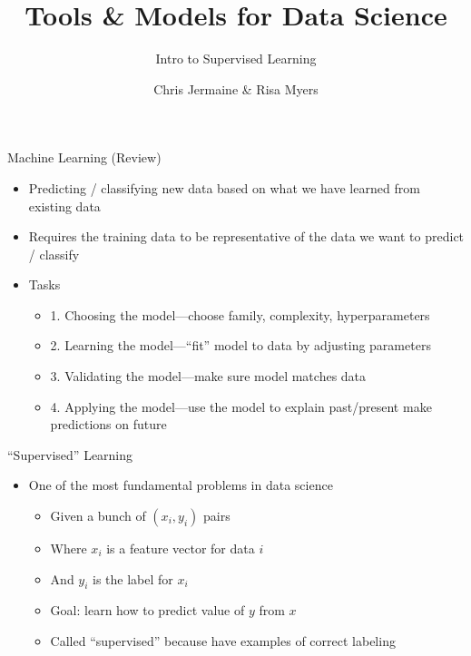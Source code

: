 \documentclass[aspectratio=169]{beamer}
\title[]
{Tools \& Models for Data Science}
\subtitle{Intro to Supervised Learning}
\author[]{Chris Jermaine \& Risa Myers}
\institute
{
  Rice University 
}
\date[]{}
\begin{document}
\begin{frame}
 \titlepage
\end{frame}

\begin{frame}{Machine Learning (Review)}

\begin{itemize}
\item Predicting / classifying new data based on what we have learned from existing data
\item Requires the training data to be representative of the data we want to predict / classify
\item Tasks
	\begin{itemize}
	\item 1. Choosing the model---choose family, complexity, hyperparameters
	\item 2. Learning the model---``fit'' model to data by adjusting parameters
	\item 3. Validating the model---make sure model matches data
	\item 4. Applying the model---use the model to explain past/present make predictions on future
	\end{itemize}
\end{itemize}
\end{frame}
\begin{frame}{``Supervised'' Learning}

\begin{itemize}
\item One of the most fundamental problems in data science
	\begin{itemize}
	\item Given a bunch of $(x_i, y_i)$ pairs
	\item Where $x_i$ is a feature vector for data $i$
	\item And $y_i$ is the label for $x_i$ 
	\item Goal: learn how to predict value of $y$ from $x$
	\item Called ``supervised'' because have examples of correct labeling
	\end{itemize}
\end{itemize}
\end{frame}
\end{document}
